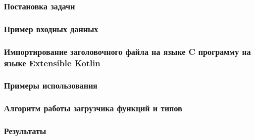\subsubsection{Постановка задачи}
\subsubsection{Пример входных данных}
\subsubsection{Импортирование заголовочного файла на языке C программу на языке Extensible Kotlin}
\subsubsection{Примеры использования}
\subsubsection{Алгоритм работы загрузчика функций и типов}
\subsubsection{Результаты}

